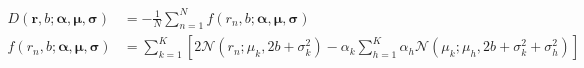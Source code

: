\begin{align*}
D(\pmb{r}, b; \pmb{\alpha}, \pmb{\mu}, \pmb{\sigma}) &=
    -\frac1N \sum_{n=1}^N f(r_n, b; \pmb{\alpha}, \pmb{\mu}, \pmb{\sigma})\\
f(r_n, b; \pmb{\alpha}, \pmb{\mu}, \pmb{\sigma}) &= \sum_{k=1}^K \left[
    2\mathcal{N}(r_n; \mu_k, 2b+\sigma_k^2)
    -\alpha_k \sum_{h=1}^K \alpha_h \mathcal{N}(\mu_k; \mu_h, 2b+\sigma_k^2+\sigma_h^2)
\right]
\end{align*}
